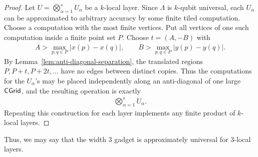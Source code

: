 \begin{example}
\begin{proof}
Let \(U=\bigotimes_{\alpha=1}^{s}U_\alpha\) be a \(k\)-local layer. Since
\(\Lambda\) is \(k\)-qubit universal, each \(U_\alpha\) can be approximated to arbitrary accuracy by some finite tiled
computation. Choose a computation with the most finite vertices. Put all vertices of one such
computation inside a finite point set \(P\). Choose \(t=(A,-B)\) with
\begin{align}
    A>\max_{p,q\in P}|x(p)-x(q)|,
    \qquad
    B>\max_{p,q\in P}|y(p)-y(q)|.
\end{align}
By Lemma~\ref{lem:anti-diagonal-separation}, the translated regions
\(P,P+t,P+2t,\ldots\) have no edges between distinct copies. Thus the
computations for the \(U_\alpha\)'s may be placed independently along an
anti-diagonal of one large \(\mathsf{CGrid}\), and the resulting operation is exactly
\begin{align}
    \bigotimes_{\alpha=1}^{s}U_\alpha.
\end{align}
Repeating this construction for each layer implements any finite product of
\(k\)-local layers.
\end{proof}

Thus, we may say that the width 3 gadget is approximately universal for $3$-local layers.
\end{example}
